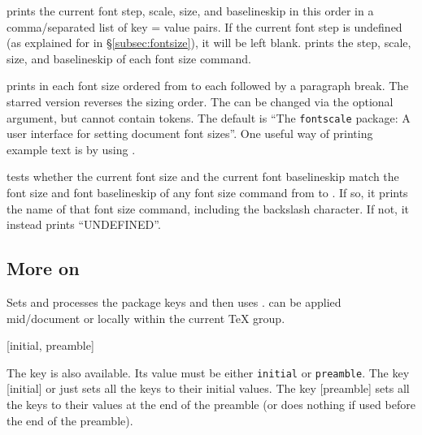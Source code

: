 \documentclass{beery}
\begin{document}
\nopagebreak\newline
{}

 prints the current font step, scale, size, and baselineskip in this order in a comma\-/separated list of key = value pairs.
If the current font step is undefined (as explained for  in \S\ref{subsec:fontsize}), it will be left blank.
 prints the step, scale, size, and baselineskip of each font size command.

\nopagebreak\newline
{}

 prints  in each font size ordered from  to  each followed by a paragraph break.
The starred version  reverses the sizing order.
The  can be changed via the optional argument, but cannot contain  tokens.
The default  is \enquote{The \texttt{fontscale} package: A user interface for setting document font sizes}.
One useful way of printing example text is by using
.

\KeepNextPar*

 tests whether the current font size and the current font baselineskip match the font size and font baselineskip of any font size command from  to .
If so, it prints the name of that font size command, including the backslash character.
If not, it instead prints \enquote{UNDEFINED\@}.
\vfill\pagebreak%

\subsection
  {%
    \texorpdfstring
      {More on }
      {More on \textbackslash{}fontscalesetup}%
  }
\label{subsec:fontscalesetup}

\KeepNextPar*

Sets and processes the  package keys and then uses .
 can be applied mid\-/document or locally within the current \TeX{} group.

[initial, preamble]
\KeepNextPar*

The key  is also available.
Its value must be either \texttt{initial} or \texttt{preamble}.
The key [initial] or just  sets all the keys to their initial values.
The key [preamble] sets all the keys to their values at the end of the preamble (or does nothing if used before the end of the preamble).
\end{document}
